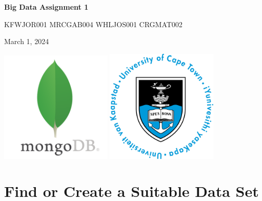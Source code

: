 \documentclass[11pt]{article}
\author{Matthew}
\date{\today}
\title{}
\begin{document}
\begin{LATEX}
\begin{titlepage}

  \centering
  {\Large\bfseries Big Data Assignment 1 \par}
  \vspace{0.5cm}

  {\large KFWJOR001 MRCGAB004 WHLJOS001 CRGMAT002\par}
  \vspace{0.5cm}

  {\large March 1, 2024\par}

  \vspace{2cm}
  \includegraphics[width=0.4\textwidth]{mongo.png}
  \includegraphics[width=0.4\textwidth]{uct.png}
\end{titlepage}
\tableofcontents
\end{LATEX}
\pagebreak
\section{Find or Create a Suitable Data Set}
\label{sec:org395ac93}
\end{document}
